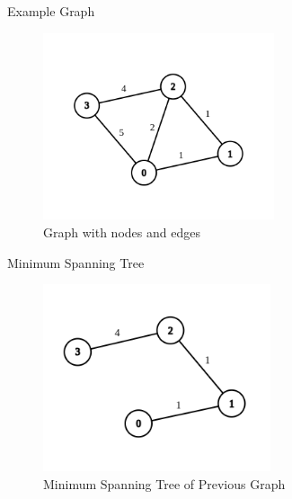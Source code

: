 \documentclass[10pt, aspectratio=169]{beamer}
\begin{document}
    \begin{frame}{Example Graph}
        \begin{center}
            \begin{figure}
                \centering
                \includegraphics[height=5.5cm, keepaspectratio]{images/graph.png}
                \caption{Graph with nodes and edges \cite{graphs}}
            \end{figure}
        \end{center}
    \end{frame}
    
    \begin{frame}{Minimum Spanning Tree}
        \begin{center}
            \begin{figure}
                \centering
                \includegraphics[height=5.5cm, keepaspectratio]{images/mst.png}
                \caption{Minimum Spanning Tree of Previous Graph \cite{graphs}}
            \end{figure}
        \end{center}
    \end{frame}
    
\end{document}
